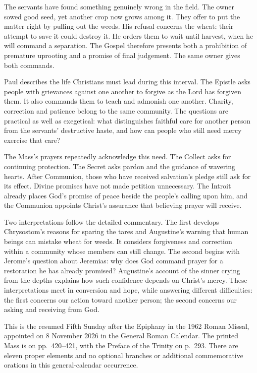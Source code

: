 The servants have found something genuinely wrong in the field. The owner
sowed good seed, yet another crop now grows among it. They offer to put the
matter right by pulling out the weeds. His refusal concerns the wheat:
their attempt to save it could destroy it. He orders them to wait until
harvest, when he will command a separation. The Gospel therefore presents
both a prohibition of premature uprooting and a promise of final judgement.
The same owner gives both commands.

Paul describes the life Christians must lead during this interval. The
Epistle asks people with grievances against one another to forgive as the
Lord has forgiven them. It also commands them to teach and admonish one
another. Charity, correction and patience belong to the same community.
The questions are practical as well as exegetical: what distinguishes
faithful care for another person from the servants' destructive haste,
and how can people who still need mercy exercise that care?

The Mass's prayers repeatedly acknowledge this need. The Collect asks for
continuing protection. The Secret asks pardon and the guidance of wavering
hearts. After Communion, those who have received salvation's pledge still
ask for its effect. Divine promises have not made petition unnecessary.
The Introit already places God's promise of peace beside the people's
calling upon him, and the Communion appoints Christ's assurance that
believing prayer will receive.

Two interpretations follow the detailed commentary. The first develops
Chrysostom's reasons for sparing the tares and Augustine's warning that
human beings can mistake wheat for weeds. It considers forgiveness and
correction within a community whose members can still change. The second
begins with Jerome's question about Jeremias: why does God command prayer
for a restoration he has already promised? Augustine's account of the
sinner crying from the depths explains how such confidence depends on
Christ's mercy. These interpretations meet in conversion and hope, while
answering different difficulties: the first concerns our action toward
another person; the second concerns our asking and receiving from God.

This is the resumed Fifth Sunday after the Epiphany in the 1962 Roman
Missal, appointed on 8 November 2026 in the General Roman Calendar.
The printed Mass is on pp.~420--421, with the Preface of the Trinity
on p.~293. There are eleven proper elements and no optional branches
or additional commemorative orations in this general-calendar occurrence.

